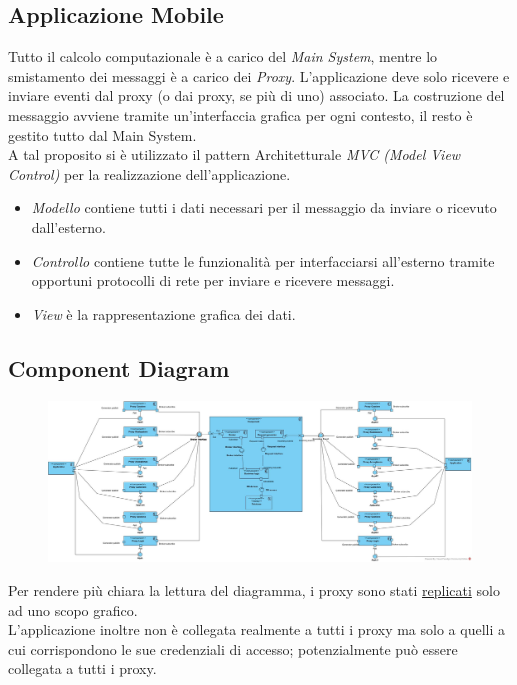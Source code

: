 \subsection{Applicazione Mobile}
Tutto il calcolo computazionale è a carico del \textit{Main System}, mentre lo smistamento dei messaggi è a carico dei \textit{Proxy}. L'applicazione deve solo ricevere e inviare eventi dal proxy (o dai proxy, se più di uno) associato. La costruzione del messaggio avviene tramite un'interfaccia grafica per ogni contesto, il resto è gestito tutto dal Main System.
\\A tal proposito si è utilizzato il pattern Architetturale \textit{MVC (Model View Control)} per la realizzazione dell'applicazione.
\begin{itemize}
	\item \textit{Modello} contiene tutti i dati necessari per il messaggio da inviare o ricevuto dall'esterno.
	\item \textit{Controllo} contiene tutte le funzionalità per interfacciarsi all'esterno tramite opportuni protocolli di rete per inviare e ricevere messaggi.
	\item \textit{View} è la rappresentazione grafica dei dati.
\end{itemize}



\subsection{Component Diagram}
\begin{figure}[H]
	\centering
	\includegraphics[width=1\textwidth]{Immagini/components.jpg}
\end{figure}
Per rendere più chiara la lettura del diagramma, i proxy sono stati \underline{replicati} solo ad uno scopo grafico. 
\\L'applicazione inoltre non è collegata realmente a tutti i proxy ma solo a quelli a cui corrispondono le sue credenziali di accesso; potenzialmente può essere collegata a tutti i proxy.

